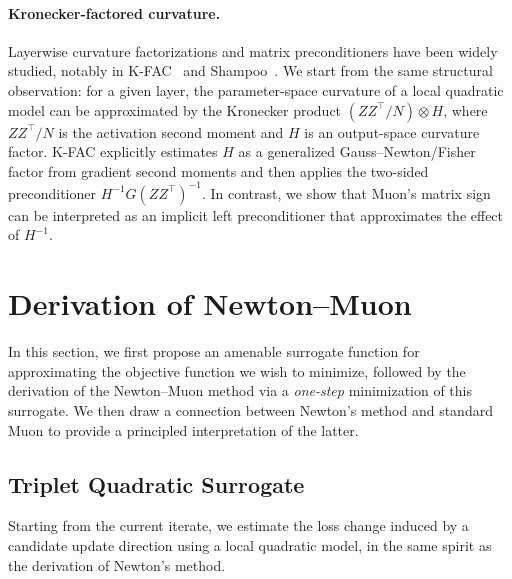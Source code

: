 \documentclass[11pt]{article}
\begin{document}
\paragraph{Kronecker-factored curvature.}
Layerwise curvature factorizations and matrix preconditioners have been widely studied, notably in K-FAC~\citep{martens2015optimizing} and Shampoo~\citep{gupta2018shampoo}. We start from the same structural observation: for a given layer, the parameter-space curvature of a local quadratic model can be approximated by the Kronecker product $({Z}{Z}^\top/N)\otimes {H}$, where ${Z}{Z}^\top/N$ is the activation second moment and ${H}$ is an output-space curvature factor. K-FAC explicitly estimates ${H}$ as a generalized Gauss--Newton/Fisher factor from gradient second moments and then applies the two-sided preconditioner ${H}^{-1}{G}({Z}{Z}^\top)^{-1}$. In contrast, we show that Muon's matrix sign can be interpreted as an implicit left preconditioner that approximates the effect of ${H}^{-1}$.


\section{Derivation of Newton--Muon}
\label{sec:exact-and-transformer}
In this section, we first propose an amenable surrogate function for approximating the objective function we wish to minimize, followed by the derivation of the Newton--Muon method via a \textit{one-step} minimization of this surrogate. We then draw a connection between Newton's method and standard Muon to provide a principled interpretation of the latter. 

\subsection{Triplet Quadratic Surrogate}

Starting from the current iterate, we estimate the loss change induced by a candidate update direction using a local quadratic model, in the same spirit as the derivation of Newton's method. 
\end{document}
